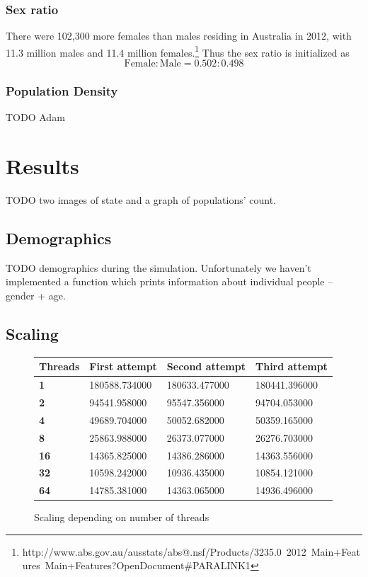 \documentclass[a4paper]{article}
\begin{document}
\subsubsection{Sex ratio}

There were 102,300 more females than males residing in Australia in 2012, with 11.3 million males and 11.4 million females.\footnote{http://www.abs.gov.au/ausstats/abs@.nsf/Products/3235.0~2012~Main+Features~Main+Features?OpenDocument\#PARALINK1}
Thus the sex ratio is initialized as 
$$ \text{Female} : \text{Male} = 0.502 : 0.498 $$

\subsubsection{Population Density}

TODO Adam


\section{Results}

TODO two images of state and a graph of populations' count.

\subsection{Demographics}

TODO demographics during the simulation.
Unfortunately we haven't implemented a function which prints information about individual people -- gender + age.

\subsection{Scaling}

\begin{figure}[ht]
    \centering
    \begin{tabu} {| X[0.8,c,p] || X[1,c,p] | X[1,c,p] | X[1,c,p] |}
        \rowfont{\bfseries}
        \hline
        Threads &
        First attempt &
        Second attempt&
        Third attempt \\
        \hline
        \hline
        \textbf{1} & 180588.734000 & 180633.477000 & 180441.396000 \\
        \hline
        \textbf{2} & 94541.958000 & 95547.356000 & 94704.053000 \\
        \hline
        \textbf{4} & 49689.704000 & 50052.682000 & 50359.165000 \\
        \hline
        \textbf{8} & 25863.988000 & 26373.077000 & 26276.703000 \\
        \hline
        \textbf{16} & 14365.825000 & 14386.286000 & 14363.556000 \\
        \hline
        \textbf{32} & 10598.242000 & 10936.435000 & 10854.121000 \\
        \hline
        \textbf{64} & 14785.381000 & 14363.065000 & 14936.496000 \\
        \hline
    \end{tabu}
    \caption{Scaling depending on number of threads}
\end{figure}
\end{document}
